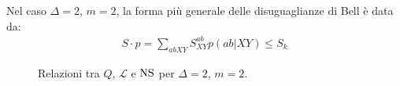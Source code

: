 \documentclass[../../InformazioneQuantistica.tex]{subfiles}
\begin{document}
Nel caso $\Delta =2$, $m=2$, la forma più generale delle disuguaglianze di Bell è data da:
\begin{align*}
S \cdot p = \sum_{abXY} S_{XY}^{ab} p(ab|XY) \leq S_k
\end{align*}


\begin{figure}[H]
\centering

\caption{Relazioni tra $Q$, $\mathcal{L}$ e $\operatorname{NS}$ per $\Delta=2$, $m=2$.\label{fig:delta2-rel}}
\end{figure}

\end{document}
